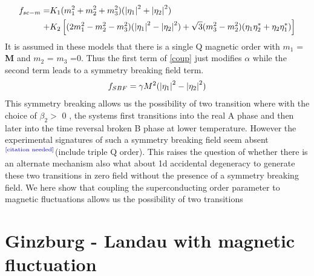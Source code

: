 \documentclass[prl,notitlepage,aps]{revtex4-1}
\newcommand{\cn}{$^\text{\color{blue}[citation needed]}$}
\begin{document}
\begin{align}
f_{sc-m} =& K_1(m_1^2+m_2^2+m_3^2)(\abs{\eta_1}^2+\abs{\eta_2}^2)\nonumber \\ 
+& K_2 \left[(2m_1^2 - m_2^2-m_3^2)(\abs{\eta_1}^2-\abs{\eta_2}^2)+\sqrt{3}(m_3^2-m_2^2)(\eta_1\eta_2^*+\eta_2\eta_1^*)\right]
\label{coup}
\end{align}
It is assumed in these models that there is a single Q magnetic order with $m_1$ = \textbf{M} and $m_2$ = $m_3$ =0.  Thus the first term of \eqref{coup} just modifies $\alpha$  while the second term leads to a symmetry breaking field term.
\begin{align}
f_{SBF} = \gamma M^2 (\abs{\eta_1}^2-\abs{\eta_2}^2)
\end{align}
This symmetry breaking allows us the possibility of two transition where with the choice of $\beta_2 >$  0 , the systems first transitions into the real A phase and then later into the time reversal broken B phase at lower temperature. However the experimental signatures of such a symmetry breaking field seem absent \cn (include triple Q order). This raises the question of whether there is an alternate mechanism{\color{red} also what about 1d accidental degeneracy} to generate these two transitions in zero field without the presence of a symmetry breaking field. We here show that coupling the superconducting order parameter to magnetic fluctuations allows us the possibility of two transitions
\section{Ginzburg - Landau with magnetic fluctuation}
\label{Landau_UP}
\end{document}
